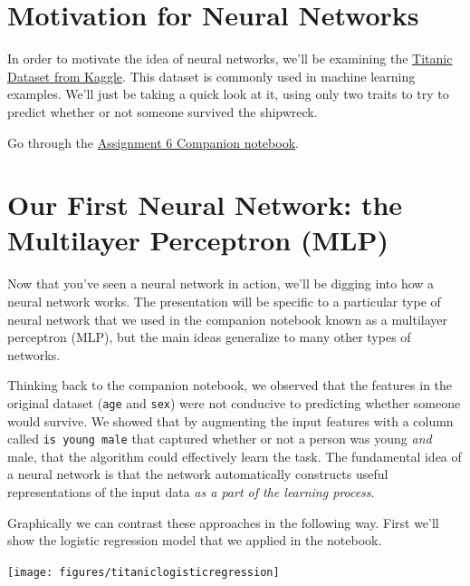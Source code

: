 \documentclass[assignment06_Solutions]{subfiles}
\begin{document}
\section{Motivation for Neural Networks}

In order to motivate the idea of neural networks, we'll be examining the \href{https://www.kaggle.com/c/titanic}{Titanic Dataset from Kaggle}. This dataset is commonly used in machine learning examples. We'll just be taking a quick look at it, using only two traits to try to predict whether or not someone survived the shipwreck.

\vspace{1em}
\begin{externalresources}[(45 minutes)]
Go through the \href{https://colab.research.google.com/drive/137d9N0jnsVqlKIwDFUy3zauIXx9UDIOr?usp=sharing}{Assignment 6 Companion notebook}.
\end{externalresources}

\section{Our First Neural Network: the Multilayer Perceptron (MLP)}

Now that you've seen a neural network in action, we'll be digging into how a neural network works.  The presentation will be specific to a particular type of neural network that we used in the companion notebook known as a multilayer perceptron (MLP), but the main ideas generalize to many other types of networks.

Thinking back to the companion notebook, we observed that the features in the original dataset ({\tt age} and {\tt sex}) were not conducive to predicting whether someone would survive.  We showed that by augmenting the input features with a column called {\tt is young male} that captured whether or not a person was young \emph{and} male, that the algorithm could effectively learn the task.  The fundamental idea of a neural network is that the network automatically constructs useful representations of the input data \emph{as a part of the learning process}.

Graphically we can contrast these approaches in the following way.  First we'll show the logistic regression model that we applied in the notebook.

\texttt{[image: figures/titaniclogisticregression]}
\end{document}
